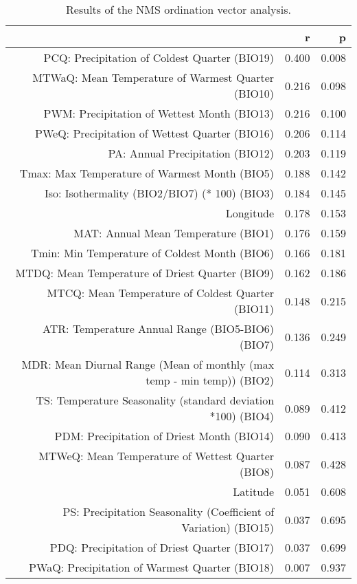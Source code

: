 \begin{table}[ht]
\centering
\begin{tabular}{rrr}
  \hline
 & r & p \\ 
  \hline
PCQ: Precipitation of Coldest Quarter (BIO19) & 0.400 & 0.008 \\ 
  MTWaQ: Mean Temperature of Warmest Quarter (BIO10) & 0.216 & 0.098 \\ 
  PWM: Precipitation of Wettest Month (BIO13) & 0.216 & 0.100 \\ 
  PWeQ: Precipitation of Wettest Quarter (BIO16) & 0.206 & 0.114 \\ 
  PA: Annual Precipitation (BIO12) & 0.203 & 0.119 \\ 
  Tmax: Max Temperature of Warmest Month (BIO5) & 0.188 & 0.142 \\ 
  Iso: Isothermality (BIO2/BIO7) (* 100) (BIO3) & 0.184 & 0.145 \\ 
  Longitude & 0.178 & 0.153 \\ 
  MAT: Annual Mean Temperature (BIO1) & 0.176 & 0.159 \\ 
  Tmin: Min Temperature of Coldest Month (BIO6) & 0.166 & 0.181 \\ 
  MTDQ: Mean Temperature of Driest Quarter (BIO9) & 0.162 & 0.186 \\ 
  MTCQ: Mean Temperature of Coldest Quarter (BIO11) & 0.148 & 0.215 \\ 
  ATR: Temperature Annual Range (BIO5-BIO6) (BIO7) & 0.136 & 0.249 \\ 
  MDR: Mean Diurnal Range (Mean of monthly (max temp - min temp)) (BIO2) & 0.114 & 0.313 \\ 
  TS: Temperature Seasonality (standard deviation *100) (BIO4) & 0.089 & 0.412 \\ 
  PDM: Precipitation of Driest Month (BIO14) & 0.090 & 0.413 \\ 
  MTWeQ: Mean Temperature of Wettest Quarter (BIO8) & 0.087 & 0.428 \\ 
  Latitude & 0.051 & 0.608 \\ 
  PS: Precipitation Seasonality (Coefficient of Variation) (BIO15) & 0.037 & 0.695 \\ 
  PDQ: Precipitation of Driest Quarter (BIO17) & 0.037 & 0.699 \\ 
  PWaQ: Precipitation of Warmest Quarter (BIO18) & 0.007 & 0.937 \\ 
   \hline
\end{tabular}
\caption{Results of the NMS ordination vector analysis.} 
\label{tab:wc_vec}
\end{table}
